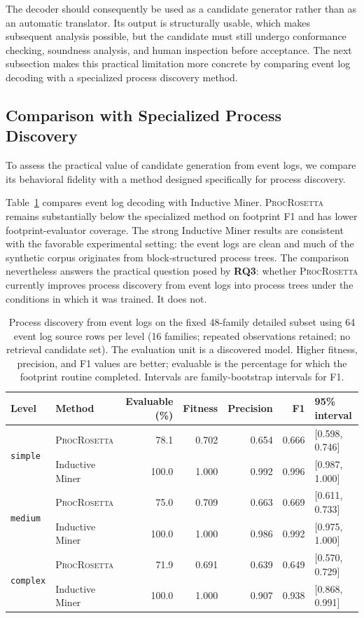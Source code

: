 \documentclass[mathematics,article,submit,moreauthors]{Definitions/mdpi}
\newcommand{\model}{\textsc{ProcRosetta}\xspace}
\newcommand{\RQthree}{\textbf{RQ3}}
\begin{document}
The decoder should consequently be used as a candidate generator rather than as an automatic translator. Its output is structurally usable, which makes subsequent analysis possible, but the candidate must still undergo conformance checking, soundness analysis, and human inspection before acceptance. The next subsection makes this practical limitation more concrete by comparing event log decoding with a specialized process discovery method.

\subsection{Comparison with Specialized Process Discovery}

To assess the practical value of candidate generation from event logs, we compare its behavioral fidelity with a method designed specifically for process discovery.

Table~\ref{tab:discovery} compares event log decoding with Inductive Miner. \model remains substantially below the specialized method on footprint F1 and has lower footprint-evaluator coverage. The strong Inductive Miner results are consistent with the favorable experimental setting: the event logs are clean and much of the synthetic corpus originates from block-structured process trees. The comparison nevertheless answers the practical question posed by \RQthree: whether \model currently improves process discovery from event logs into process trees under the conditions in which it was trained. It does not.

\begin{table}[!b]
\centering
\caption{Process discovery from event logs on the fixed 48-family detailed subset using 64 event log source rows per level (16 families; repeated observations retained; no retrieval candidate set). The evaluation unit is a discovered model. Higher fitness, precision, and F1 values are better; evaluable is the percentage for which the footprint routine completed. Intervals are family-bootstrap intervals for F1.}
\label{tab:discovery}
\setlength{\tabcolsep}{4pt}
\begin{tabular}{@{}llrrrrl@{}}
\toprule
Level & Method & Evaluable (\%) & Fitness & Precision & F1 & 95\% interval \\
\midrule
\multirow{2}{*}{\texttt{simple}}
 & \model{} & 78.1 & 0.702 & 0.654 & 0.666 & [0.598, 0.746] \\
 & Inductive Miner & 100.0 & 1.000 & 0.992 & 0.996 & [0.987, 1.000] \\
\midrule
\multirow{2}{*}{\texttt{medium}}
 & \model{} & 75.0 & 0.709 & 0.663 & 0.669 & [0.611, 0.733] \\
 & Inductive Miner & 100.0 & 1.000 & 0.986 & 0.992 & [0.975, 1.000] \\
\midrule
\multirow{2}{*}{\texttt{complex}}
 & \model{} & 71.9 & 0.691 & 0.639 & 0.649 & [0.570, 0.729] \\
 & Inductive Miner & 100.0 & 1.000 & 0.907 & 0.938 & [0.868, 0.991] \\
\bottomrule
\end{tabular}
\end{table}
\end{document}
